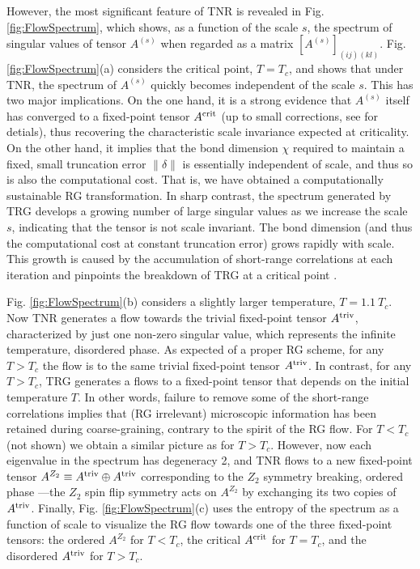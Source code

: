 \documentclass[aps,prl,twocolumn,showpacs,superscriptaddress,floatfix,10pt]{revtex4-1}
\def\TRI{\mbox{\scriptsize triv}}
\def\CRI{\mbox{\scriptsize crit}}
\begin{document}
However, the most significant feature of TNR is revealed in Fig. \ref{fig:FlowSpectrum}, which shows, as a function of the scale $s$, the spectrum of singular values of tensor $A^{(s)}$ when regarded as a matrix $[A^{(s)}]_{(ij)(kl)}$. 
Fig. \ref{fig:FlowSpectrum}(a) considers the critical point, $T=T_c$, and shows that under TNR, the spectrum of $A^{(s)}$ quickly becomes independent of the scale $s$. This has two major implications. On the one hand, it is a strong evidence that $A^{(s)}$ itself has converged to a fixed-point tensor $A^{\CRI}$ (up to small corrections, see \cite{AppendixA} for detials), thus recovering the characteristic scale invariance expected at criticality. 
On the other hand, it implies that the bond dimension $\chi$ required to maintain a fixed, small truncation error $\| \delta \|$ is essentially independent of scale, and thus so is also the computational cost. That is, we have obtained a computationally sustainable RG transformation.
In sharp contrast, the spectrum generated by TRG develops a growing number of large singular values as we increase the scale $s$, indicating that the tensor is not scale invariant. The bond dimension (and thus the computational cost at constant truncation error) grows rapidly with scale. This growth is caused by the accumulation of short-range correlations at each iteration and pinpoints the breakdown of TRG at a critical point \cite{AppendixC}. 

Fig. \ref{fig:FlowSpectrum}(b) considers a slightly larger temperature, $T=1.1 \ T_c$. Now TNR generates a flow towards the trivial fixed-point tensor $A^{\TRI}$, characterized by just one non-zero singular value, which represents the infinite temperature, disordered phase. As expected of a proper RG scheme, for any $T> T_c$ the flow is to the same trivial fixed-point tensor $A^{\TRI}$. In contrast, for any $T>T_c$, TRG generates a flows to a fixed-point tensor that depends on the initial temperature $T$. In other words, failure to remove some of the short-range correlations implies that (RG irrelevant) microscopic information has been retained during coarse-graining, contrary to the spirit of the RG flow. For $T<T_c$ (not shown) we obtain a similar picture as for $T>T_c$. However, now each eigenvalue in the spectrum has degeneracy 2, and TNR flows to a new fixed-point tensor $A^{Z_2} \equiv A^{\TRI}\oplus A^{\TRI}$ corresponding to the $Z_2$ symmetry breaking, ordered phase ---the $Z_2$ spin flip symmetry acts on $A^{Z_2}$ by exchanging its two copies of $A^{\TRI}$. Finally, Fig. \ref{fig:FlowSpectrum}(c) uses the entropy of the spectrum as a function of scale to visualize the RG flow towards one of the three fixed-point tensors: the ordered $A^{Z_2}$ for $T<T_c$, the critical $A^{\CRI}$ for $T=T_c$, and the disordered $A^{\TRI}$ for $T>T_c$. 
\end{document}
